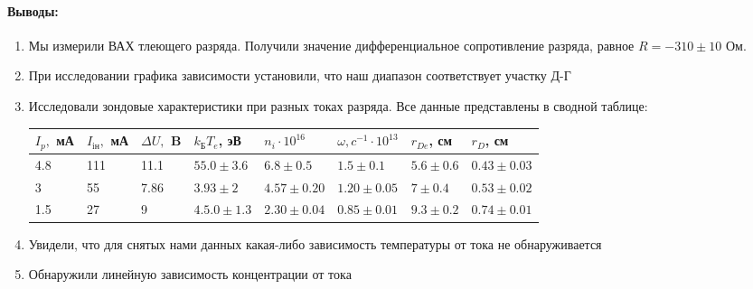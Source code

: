 \documentclass[a4paper,12pt]{article}
\begin{document}
\paragraph{Выводы:}
\begin{enumerate}
\item Мы измерили ВАХ тлеющего разряда. Получили значение дифференциальное сопротивление разряда, равное $R=-310 \pm 10$ Ом.
\item При исследовании графика зависимости установили, что наш диапазон соответствует участку Д-Г
\item Исследовали зондовые характеристики при разных токах разряда. Все данные представлены в сводной таблице:
\begin{table}[h!]
\centering
\begin{tabular}{|l|l|l|l|l|l|l|l|}
\hline
$I_p,$ мА & $I_{{\text{iн}}},$ мА & $\Delta U,$ B & $k_{\text{Б}}T_e$, эВ & $n_i \cdot 10^{16}$ & $\omega , c^{-1}\cdot 10^{13}$ & $r_{De}$, см & $r_D$, см      \\ \hline
4.8       & 111                 & 11.1          & $55.0 \pm 3.6$         & $6.8\pm 0.5$        & $1.5\pm 0.1$                    & $5.6\pm 0.6$ & $0.43\pm 0.03$ \\ \hline
3         & 55                  & 7.86          & $3.93\pm 2$            & $4.57\pm 0.20$      & $1.20\pm 0.05$                  & $7\pm 0.4$   & $0.53\pm 0.02$ \\ \hline
1.5       & 27                  & 9             & $4.5.0\pm 1.3$         & $2.30\pm 0.04$      & $0.85\pm 0.01$                  & $9.3\pm 0.2$ & $0.74\pm 0.01$ \\ \hline
\end{tabular}
\end{table}
\item Увидели, что для снятых нами данных какая-либо зависимость температуры от тока не обнаруживается
\item Обнаружили линейную зависимость концентрации от тока
\end{enumerate}
\end{document}
